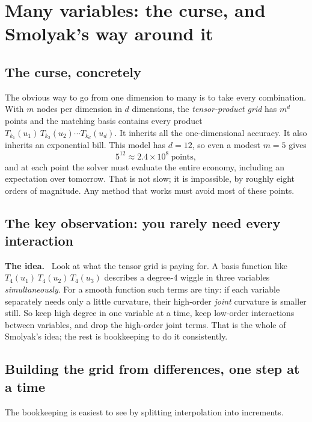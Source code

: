 \documentclass[10pt,a4paper]{article}
\newenvironment{idea}{\begin{shaded}\noindent\textbf{The idea.}\ }{\end{shaded}}
\theoremstyle{plain}
\theoremstyle{remark}
\begin{document}
\section{Many variables: the curse, and Smolyak's way around it}
\label{sec:smolyak}

\subsection{The curse, concretely}

The obvious way to go from one dimension to many is to take every combination. With $m$
nodes per dimension in $d$ dimensions, the \emph{tensor-product grid} has $m^d$ points and
the matching basis contains every product $T_{k_1}(u_1)\,T_{k_2}(u_2)\cdots T_{k_d}(u_d)$.
It inherits all the one-dimensional accuracy. It also inherits an exponential bill. This model
has $d=12$, so even a modest $m=5$ gives
\[
  5^{12} \approx 2.4\times10^{8}\ \text{points},
\]
and at each point the solver must evaluate the entire economy, including an expectation over
tomorrow. That is not slow; it is impossible, by roughly eight orders of magnitude. Any method
that works must avoid most of these points.

\subsection{The key observation: you rarely need every interaction}

\begin{idea}
Look at what the tensor grid is paying for. A basis function like
$T_4(u_1)\,T_4(u_2)\,T_4(u_3)$ describes a degree-4 wiggle in three variables
\emph{simultaneously}. For a smooth function such terms are tiny: if each variable separately
needs only a little curvature, their high-order \emph{joint} curvature is smaller still. So
keep high degree in one variable at a time, keep low-order interactions between variables,
and drop the high-order joint terms. That is the whole of Smolyak's idea; the rest is
bookkeeping to do it consistently.
\end{idea}

\subsection{Building the grid from differences, one step at a time}

The bookkeeping is easiest to see by splitting interpolation into increments.
\end{document}
